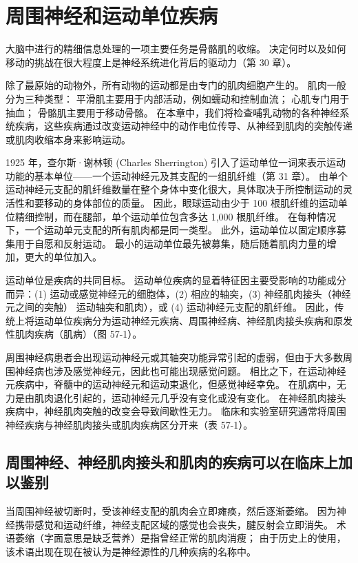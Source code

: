 \chapter{周围神经和运动单位疾病} \label{chap:chap57}
大脑中进行的精细信息处理的一项主要任务是骨骼肌的收缩。 决定何时以及如何移动的挑战在很大程度上是神经系统进化背后的驱动力（第 30 章）。

除了最原始的动物外，所有动物的运动都是由专门的肌肉细胞产生的。 肌肉一般分为三种类型： 平滑肌主要用于内部活动，例如蠕动和控制血流； 心肌专门用于抽血； 骨骼肌主要用于移动骨骼。 在本章中，我们将检查哺乳动物的各种神经系统疾病，这些疾病通过改变运动神经中的动作电位传导、从神经到肌肉的突触传递或肌肉收缩本身来影响运动。

1925 年，查尔斯·谢林顿 (Charles Sherrington) 引入了运动单位一词来表示运动功能的基本单位——一个运动神经元及其支配的一组肌纤维（第 31 章）。 由单个运动神经元支配的肌纤维数量在整个身体中变化很大，具体取决于所控制运动的灵活性和要移动的身体部位的质量。 因此，眼球运动由少于 100 根肌纤维的运动单位精细控制，而在腿部，单个运动单位包含多达 1,000 根肌纤维。 在每种情况下，一个运动单元支配的所有肌肉都是同一类型。 此外，运动单位以固定顺序募集用于自愿和反射运动。 最小的运动单位最先被募集，随后随着肌肉力量的增加，更大的单位加入。

运动单位是疾病的共同目标。 运动单位疾病的显着特征因主要受影响的功能成分而异：(1) 运动或感觉神经元的细胞体，(2) 相应的轴突，(3) 神经肌肉接头（神经元之间的突触） 运动轴突和肌肉），或 (4) 运动神经元支配的肌纤维。 因此，传统上将运动单位疾病分为运动神经元疾病、周围神经病、神经肌肉接头疾病和原发性肌肉疾病（肌病）（图 57-1）。

周围神经病患者会出现运动神经元或其轴突功能异常引起的虚弱，但由于大多数周围神经病也涉及感觉神经元，因此也可能出现感觉问题。 相比之下，在运动神经元疾病中，脊髓中的运动神经元和运动束退化，但感觉神经幸免。 在肌病中，无力是由肌肉退化引起的，运动神经元几乎没有变化或没有变化。 在神经肌肉接头疾病中，神经肌肉突触的改变会导致间歇性无力。 临床和实验室研究通常将周围神经疾病与神经肌肉接头或肌肉疾病区分开来（表 57-1）。

\section{周围神经、神经肌肉接头和肌肉的疾病可以在临床上加以鉴别}
当周围神经被切断时，受该神经支配的肌肉会立即瘫痪，然后逐渐萎缩。 因为神经携带感觉和运动纤维，神经支配区域的感觉也会丧失，腱反射会立即消失。 术语萎缩（字面意思是缺乏营养）是指曾经正常的肌肉消瘦； 由于历史上的使用，该术语出现在现在被认为是神经源性的几种疾病的名称中。

